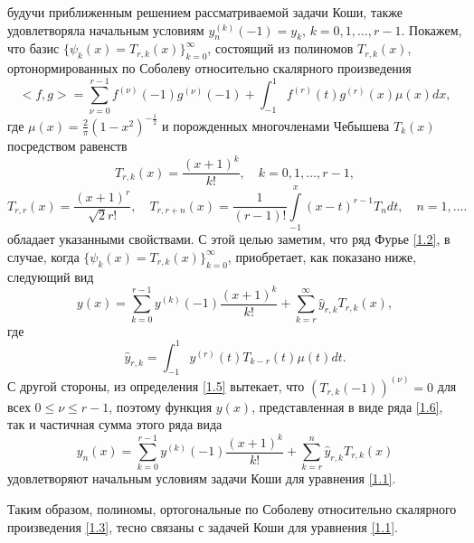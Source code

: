  будучи приближенным решением рассматриваемой задачи Коши, также удовлетворяла начальным условиям $y_n^{(k)}(-1)=y_k$, $k=0,1,\ldots,r-1$. Покажем, что  базис $\{\psi_k(x)=T_{r,k}(x)\}_{k=0}^\infty$, состоящий из полиномов
$T_{r,k}(x)$, ортонормированных по Соболеву относительно скалярного произведения
\begin{equation}\label{1.3}
<f,g>=\sum_{\nu=0}^{r-1}f^{(\nu)}(-1)g^{(\nu)}(-1)+\int_{-1}^{1}f^{(r)}(t)g^{(r)}(x)\mu(x)dx,
\end{equation}
где $\mu(x)=\frac2\pi(1-x^2)^{-\frac12}$ и порожденных многочленами Чебышева  $T_{k}(x)$ посредством равенств
   \begin{equation}\label{1.4}
T_{r,k}(x) =\frac{(x+1)^k}{k!}, \quad k=0,1,\ldots, r-1,
\end{equation}
  \begin{equation}\label{1.5}
 T_{r,r}(x) =\frac{(x+1)^r}{\sqrt{2}r!},\quad T_{r,r+n}(x) =\frac{1}{(r-1)!}\int\limits_{-1}^x(x-t)^{r-1}T_{n}dt, \quad n=1,\ldots.
\end{equation}
   обладает указанными свойствами. С этой целью заметим, что ряд Фурье \eqref{1.2}, в случае, когда $\{\psi_k(x)=T_{r,k}(x)\}_{k=0}^\infty$, приобретает, как показано ниже, следующий вид
   \begin{equation}\label{1.6}
y(x)= \sum_{k=0}^{r-1} y^{(k)}(-1)\frac{(x+1)^k}{k!}+ \sum_{k=r}^\infty \hat y_{r,k}T_{r,k}(x),
\end{equation}
где
  \begin{equation}\label{1.7}
 \hat y_{r,k}=\int_{-1}^1 y^{(r)}(t)T_{k-r}(t)\mu(t)dt.
\end{equation}
С другой стороны, из определения \eqref{1.5} вытекает, что $(T_{r,k}(-1))^{(\nu)}=0$ для всех $0\le\nu\le r-1$, поэтому функция $y(x)$, представленная в виде ряда \eqref{1.6}, так и частичная  сумма этого ряда вида
 \begin{equation}\label{1.8}
y_n(x)= \sum_{k=0}^{r-1} y^{(k)}(-1)\frac{(x+1)^k}{k!}+ \sum_{k=r}^n \hat y_{r,k}T_{r,k}(x)
\end{equation}
удовлетворяют начальным условиям задачи Коши для уравнения \eqref{1.1}.

Таким образом, полиномы, ортогональные по Соболеву относительно скалярного произведения \eqref{1.3}, тесно связаны с задачей Коши для уравнения \eqref{1.1}.

